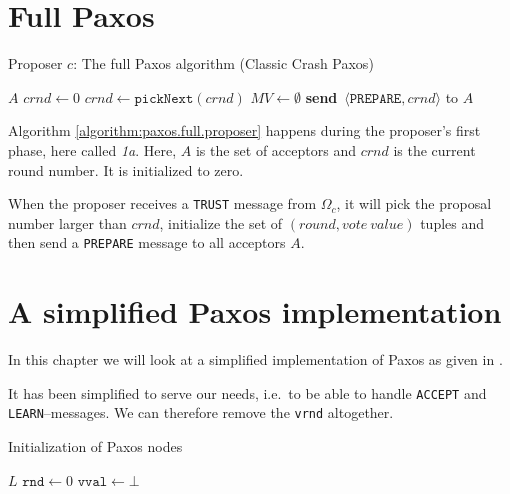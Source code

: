 \section{Full Paxos}


\begin{algorithm}[H]
  \caption{Proposer $c$: The full Paxos algorithm (Classic Crash Paxos)}
  \label{algorithm:paxos.full.proposer}
  \begin{algorithmic}
    \State $A$
    \State $crnd \leftarrow 0$
      \State $crnd \leftarrow \texttt{pickNext}(crnd)$
      \State $MV \leftarrow \emptyset$
      \State \textbf{send}~$\langle \texttt{PREPARE}, crnd \rangle$ to $A$
    \EndOn
  \end{algorithmic}
\end{algorithm}

Algorithm \ref{algorithm:paxos.full.proposer} happens during the proposer's
first phase, here called \textit{1a}.  Here, $A$ is the set of acceptors and
$crnd$ is the current round number.  It is initialized to zero.

When the proposer receives a \texttt{TRUST} message from $\Omega_c$, it will
pick the proposal number larger than $crnd$, initialize the set of
$(round, vote~value)$ tuples and then send a \texttt{PREPARE} message to all
acceptors $A$.

\section{A simplified Paxos implementation}

In this chapter we will look at a simplified implementation of Paxos as
given in \cite{Insane.Paxos}.

It has been simplified to serve our needs, i.e.~to be able to handle
\texttt{ACCEPT} and \texttt{LEARN}--messages.  We can therefore remove the
\texttt{vrnd} altogether.


\begin{algorithm}[H]
  \caption{Initialization of Paxos nodes}
  \label{paxos.algorithm.init}
  \begin{algorithmic}
    \State $L$
    \State $\texttt{rnd} \leftarrow 0$ 
    \State $\texttt{vval} \leftarrow \bot$ 
  \end{algorithmic}
\end{algorithm}

